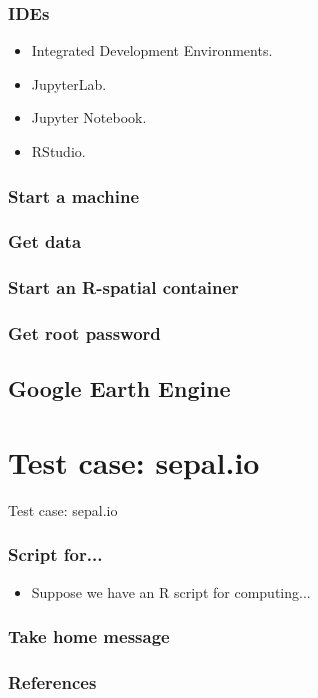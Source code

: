 \documentclass[aspectratio=169]{beamer}
\begin{document}
\begin{frame}
    \frametitle{IDEs}
    \begin{itemize}
        \item Integrated Development Environments.
        \item JupyterLab.
        \item Jupyter Notebook.
        \item RStudio.
    \end{itemize}
\end{frame}

\begin{frame}
    \frametitle{Start a machine}
\end{frame}

\begin{frame}
    \frametitle{Get data}
\end{frame}

\begin{frame}
   \frametitle{Start an R-spatial container} 
\end{frame}

\begin{frame}
   \frametitle{Get root password} 
\end{frame}


\subsection{Google Earth Engine}



\section{Test case: sepal.io}



\begin{frame}
    Test case: sepal.io
\end{frame}

\begin{frame}
    \frametitle{Script for...}
    \begin{itemize}
        \item Suppose we have an R script for computing...
    \end{itemize}
\end{frame}




\begin{frame}
    \frametitle{Take home message}
\end{frame}

\begin{frame}[allowframebreaks]
	\frametitle{References}
	\printbibliography
\end{frame}
\end{document}
